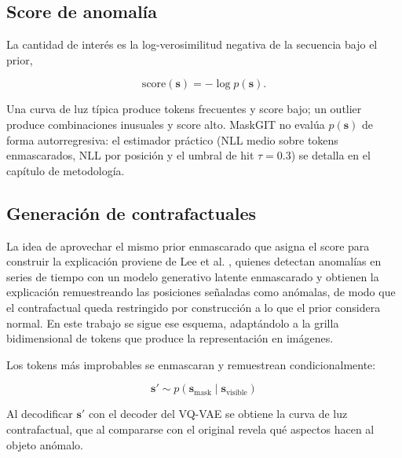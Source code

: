 \subsection{Score de anomalía}

La cantidad de interés es la log-verosimilitud negativa de la secuencia bajo el prior,

\begin{equation}
\text{score}(\mathbf{s}) = -\log p(\mathbf{s}).
\end{equation}

Una curva de luz típica produce tokens frecuentes y score bajo; un outlier produce combinaciones inusuales y score alto. MaskGIT no evalúa $p(\mathbf{s})$ de forma autorregresiva: el estimador práctico (NLL medio sobre tokens enmascarados, NLL por posición y el umbral de hit $\tau = 0.3$) se detalla en el capítulo de metodología.

\subsection{Generación de contrafactuales}

La idea de aprovechar el mismo prior enmascarado que asigna el score para construir la explicación proviene de Lee et al. \cite{lee2023timevqvae_ad}, quienes detectan anomalías en series de tiempo con un modelo generativo latente enmascarado y obtienen la explicación remuestreando las posiciones señaladas como anómalas, de modo que el contrafactual queda restringido por construcción a lo que el prior considera normal. En este trabajo se sigue ese esquema, adaptándolo a la grilla bidimensional de tokens que produce la representación en imágenes.

Los tokens más improbables se enmascaran y remuestrean condicionalmente:

\begin{equation}
\mathbf{s}' \sim p(\mathbf{s}_{\text{mask}} \mid \mathbf{s}_{\text{visible}})
\end{equation}

Al decodificar $\mathbf{s}'$ con el decoder del VQ-VAE se obtiene la curva de luz contrafactual, que al compararse con el original revela qué aspectos hacen al objeto anómalo.
